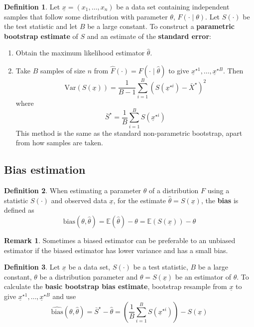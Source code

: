 \documentclass[12pt,a4paper]{article}
\theoremstyle{definition}
\newtheorem{definition}{Definition}[subsection]
\newtheorem*{remark}{Remark}
\begin{document}
\begin{definition}
	Let $\underline{x} = (x_1, \dots, x_n)$ be a data set containing independent samples that follow some distribution with parameter $\theta$, $F(\cdot \mid \theta)$. Let $S(\cdot)$ be the test statistic and let $B$ be a large constant. To construct a \textbf{parametric bootstrap estimate} of $S$ and an estimate of the \textbf{standard error}:

	\begin{enumerate}
		\item Obtain the maximum likelihood estimator $\hat{\theta}$.
		\item Take $B$ samples of size $n$ from $\hat{F}(\cdot) = F(\cdot \mid \hat{\theta})$ to give $\underline{x}^{\star 1}, \dots, \underline{x}^{\star B}$. Then
		\[
			\widehat{\text{Var}}(S(\underline{x})) = \frac{1}{B - 1} \sum_{i = 1}^{B} {\left( S \left( \underline{x}^{\star i} \right) - \bar{X}^{\star} \right)}^2
		\]
		where
		\[
			\bar{S}^{\star} = \frac{1}{B} \sum_{i = 1}^{B} S \left( \underline{x}^{\star i} \right)
		\]
		This method is the same as the standard non-parametric bootstrap, apart from how samples are taken.
	\end{enumerate}
\end{definition}

\subsection{Bias estimation}

\begin{definition}
	When estimating a parameter $\theta$ of a distribution $F$ using a statistic $S(\cdot)$ and observed data $\underline{x}$, for the estimate $\hat{\theta} = S(\underline{x})$, the \textbf{bias} is defined as
	\[
		\text{bias}(\theta, \hat{\theta}) = \mathbb{E}(\hat{\theta}) - \theta = \mathbb{E}(S(\underline{x})) - \theta
	\]
\end{definition}

\begin{remark}
	Sometimes a biased estimator can be preferable to an unbiased estimator if the biased estimator has lower variance and has a small bias.
\end{remark}

\begin{definition}
	Let $\underline{x}$ be a data set, $S(\cdot)$ be a test statistic, $B$ be a large constant, $\theta$ be a distribution parameter and $\theta = S(\underline{x})$ be an estimator of $\theta$. To calculate the \textbf{basic bootstrap bias estimate}, bootstrap resample from $\underline{x}$ to give $\underline{x}^{\star 1}, \dots, \underline{x}^{\star B}$ and use
	\[
		\widehat{\text{bias}}(\theta, \hat{\theta}) = \bar{S}^{\star} - \hat{\theta} = \left( \frac{1}{B} \sum_{i = 1}^{B} S \left( \underline{x}^{\star i} \right) \right) - S(\underline{x})
	\]
\end{definition}
\end{document}
